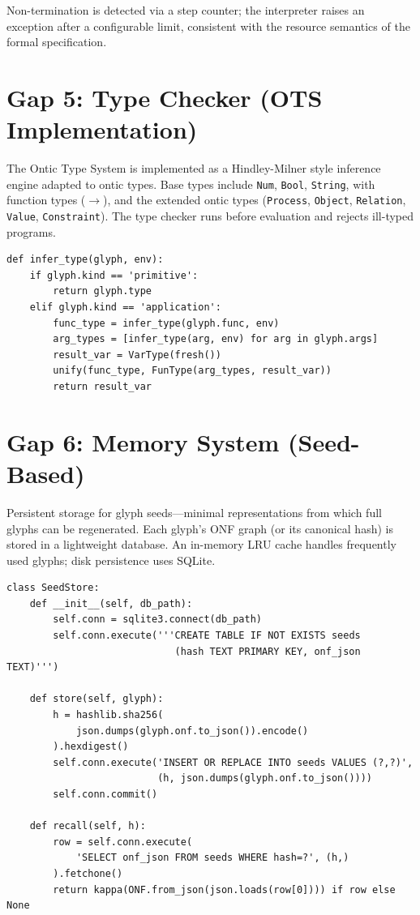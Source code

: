 \documentclass[12pt, letterpaper]{book}
\begin{document}
Non-termination is detected via a step counter; the interpreter raises an exception after a configurable limit, consistent with the resource semantics of the formal specification.

\section{Gap 5: Type Checker (OTS Implementation)}

The Ontic Type System is implemented as a Hindley-Milner style inference engine adapted to ontic types. Base types include \texttt{Num}, \texttt{Bool}, \texttt{String}, with function types ($\to$), and the extended ontic types (\texttt{Process}, \texttt{Object}, \texttt{Relation}, \texttt{Value}, \texttt{Constraint}). The type checker runs before evaluation and rejects ill-typed programs.

\begin{verbatim}
def infer_type(glyph, env):
    if glyph.kind == 'primitive':
        return glyph.type
    elif glyph.kind == 'application':
        func_type = infer_type(glyph.func, env)
        arg_types = [infer_type(arg, env) for arg in glyph.args]
        result_var = VarType(fresh())
        unify(func_type, FunType(arg_types, result_var))
        return result_var
\end{verbatim}

\section{Gap 6: Memory System (Seed-Based)}

Persistent storage for glyph seeds---minimal representations from which full glyphs can be regenerated. Each glyph's ONF graph (or its canonical hash) is stored in a lightweight database. An in-memory LRU cache handles frequently used glyphs; disk persistence uses SQLite.

\begin{verbatim}
class SeedStore:
    def __init__(self, db_path):
        self.conn = sqlite3.connect(db_path)
        self.conn.execute('''CREATE TABLE IF NOT EXISTS seeds
                             (hash TEXT PRIMARY KEY, onf_json TEXT)''')

    def store(self, glyph):
        h = hashlib.sha256(
            json.dumps(glyph.onf.to_json()).encode()
        ).hexdigest()
        self.conn.execute('INSERT OR REPLACE INTO seeds VALUES (?,?)',
                          (h, json.dumps(glyph.onf.to_json())))
        self.conn.commit()

    def recall(self, h):
        row = self.conn.execute(
            'SELECT onf_json FROM seeds WHERE hash=?', (h,)
        ).fetchone()
        return kappa(ONF.from_json(json.loads(row[0]))) if row else None
\end{verbatim}
\end{document}
